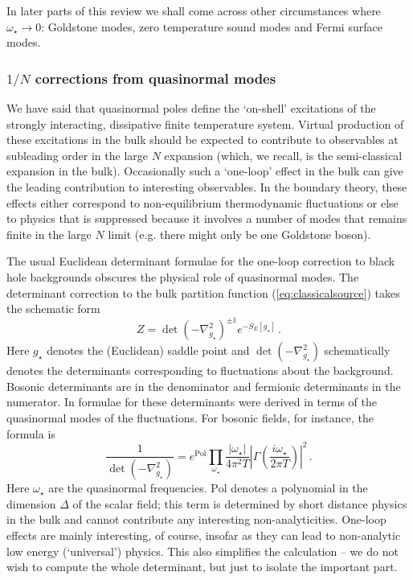 \documentclass[10pt, oneside]{book}
\def\be{\begin{equation}}
\def\ee{\end{equation}}
\begin{document}
\begin{doublespace}
In later parts of this review we shall come across other circumstances where $\omega_\star \to 0$: Goldstone modes, zero temperature sound modes and Fermi surface modes.

\subsubsection{$1/N$ corrections from quasinormal modes}

We have said that quasinormal poles define the `on-shell' excitations of the strongly interacting, dissipative finite temperature system. Virtual production of these excitations in the bulk should be expected to contribute to observables at subleading order in the large $N$ expansion (which, we recall, is the semi-classical expansion in the bulk). Occasionally such a `one-loop' effect in the bulk can give the leading contribution to interesting observables. In the boundary theory, these effects either correspond to non-equilibrium thermodynamic fluctuations or else to physics that is suppressed because it involves a number of modes that remains finite in the large $N$ limit (e.g. there might only be one Goldstone boson).

The usual Euclidean determinant formulae for the one-loop correction to black hole backgrounds obscures the physical role of quasinormal modes. The determinant correction to the bulk partition function (\ref{eq:classicalsource}) takes the schematic form
\be
Z = \det \left( - \nabla^2_{g_\star} \right)^{\pm 1} e^{-S_E[g_\star]} \,.
\ee
Here $g_\star$ denotes the (Euclidean) saddle point and $\det \left( - \nabla^2_{g_\star} \right)$ schematically denotes the determinants corresponding to fluctuations about the background. Bosonic determinants are in the denominator and fermionic determinants in the numerator. In \cite{Denef:2009yy,Denef:2009kn} formulae for these determinants were derived in terms of the quasinormal modes of the fluctuations. For bosonic fields, for instance, the formula is
\be\label{eq:modGamma}
\frac{1}{\det \left( - \nabla^2_{g_\star} \right)} = e^{\text{Pol}} \prod_{\omega_\star} \frac{|\omega_\star|}{4 \pi^2 T}
\left| \Gamma \left( \frac{i \omega_\star}{2 \pi T} \right) \right|^2 \,.
\ee
Here $\omega_\star$ are the quasinormal frequencies. $\text{Pol}$ denotes a polynomial in the dimension $\Delta$ of the scalar field; this term is determined by short distance physics in the bulk and cannot contribute any interesting non-analyticities. One-loop effects are mainly interesting, of course, insofar as they can lead to non-analytic low energy (`universal') physics. This also simplifies the calculation -- we do not wish to compute the whole determinant, but just to isolate the important part.


\end{doublespace}
\end{document}
